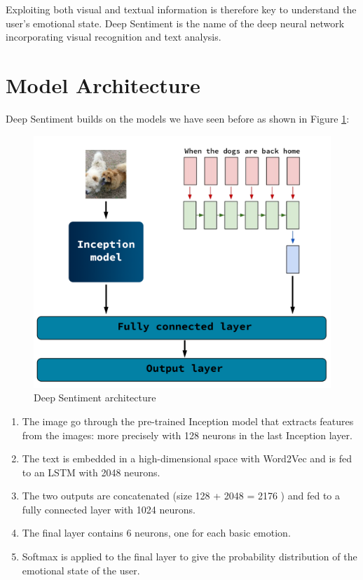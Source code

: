 Exploiting both visual and textual information is therefore key to understand the user's emotional state. Deep Sentiment is the name of the deep neural network incorporating visual recognition and text analysis.

\section{Model Architecture}

Deep Sentiment builds on the models we have seen before as shown in Figure \ref{deep-sentiment}:

\begin{figure}[H]
    \centering
    \includegraphics[width=\textwidth]{Images/deep-sentiment.png}
    \caption{Deep Sentiment architecture}
    \label{deep-sentiment}
\end{figure}

\begin{enumerate}
    \item The image go through the pre-trained Inception model that extracts features from the images: more precisely with 128 neurons in the last Inception 
    layer.
    \item The text is embedded in a high-dimensional space with Word2Vec and is fed to an LSTM with 2048 neurons.
    \item The two outputs are concatenated (size 128 + 2048 = 2176 ) and fed to a fully connected layer with 1024 neurons. 
    \item The final layer contains 6 neurons, one for each basic emotion.
    \item Softmax is applied to the final layer to give the probability distribution of the emotional state of the user.
\end{enumerate}

